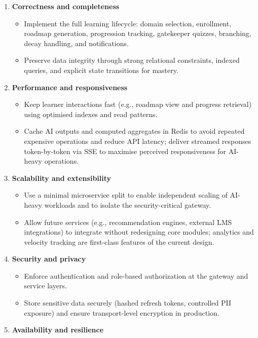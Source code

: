 \begin{enumerate}
    \item \textbf{Correctness and completeness}
        \begin{itemize}
            \item Implement the full learning lifecycle: domain selection, enrollment, roadmap generation, progression tracking, gatekeeper quizzes, branching, decay handling, and notifications.
            \item Preserve data integrity through strong relational constraints, indexed queries, and explicit state transitions for mastery.
        \end{itemize}
    \item \textbf{Performance and responsiveness}
        \begin{itemize}
            \item Keep learner interactions fast (e.g., roadmap view and progress retrieval) using optimised indexes and read patterns.
            \item Cache AI outputs and computed aggregates in Redis to avoid repeated expensive operations and reduce API latency; deliver streamed responses token-by-token via SSE to maximise perceived responsiveness for AI-heavy operations.
        \end{itemize}
    \item \textbf{Scalability and extensibility}
        \begin{itemize}
            \item Use a minimal microservice split to enable independent scaling of AI-heavy workloads and to isolate the security-critical gateway.
            \item Allow future services (e.g., recommendation engines, external LMS integrations) to integrate without redesigning core modules; analytics and velocity tracking are first-class features of the current design.
        \end{itemize}
    \item \textbf{Security and privacy}
        \begin{itemize}
            \item Enforce authentication and role-based authorization at the gateway and service layers.
            \item Store sensitive data securely (hashed refresh tokens, controlled PII exposure) and ensure transport-level encryption in production.
        \end{itemize}
    \item \textbf{Availability and resilience}

\end{enumerate}
